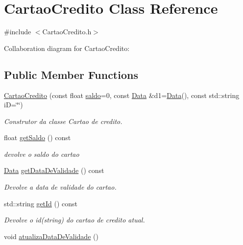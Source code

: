 \hypertarget{class_cartao_credito}{}\section{Cartao\+Credito Class Reference}
\label{class_cartao_credito}


{\ttfamily \#include $<$Cartao\+Credito.\+h$>$}



Collaboration diagram for Cartao\+Credito\+:
\subsection*{Public Member Functions}
\begin{DoxyCompactItemize}
\item 
\mbox{\hyperlink{class_cartao_credito_a49b6298290f8307df4a42b15175fb10f}{Cartao\+Credito}} (const float \mbox{\hyperlink{class_cartao_credito_a2c674ee17ab52017618bf5e3ef9dd3cd}{saldo}}=0, const \mbox{\hyperlink{class_data}{Data}} \&d1=\mbox{\hyperlink{class_data}{Data}}(), const std\+::string iD=\char`\"{}\char`\"{})
\begin{DoxyCompactList}\small\item\em Construtor da classe Cartao de credito. \end{DoxyCompactList}\item 
float \mbox{\hyperlink{class_cartao_credito_a5d10788d907961f86779efaecb6a231d}{get\+Saldo}} () const
\begin{DoxyCompactList}\small\item\em devolve o saldo do cartao \end{DoxyCompactList}\item 
\mbox{\hyperlink{class_data}{Data}} \mbox{\hyperlink{class_cartao_credito_ab28b73bbecc20b5c23348e1172230533}{get\+Data\+De\+Validade}} () const
\begin{DoxyCompactList}\small\item\em Devolve a data de validade do cartao. \end{DoxyCompactList}\item 
std\+::string \mbox{\hyperlink{class_cartao_credito_ab59d60e4d155e7f29aef888ea3139ee5}{get\+Id}} () const
\begin{DoxyCompactList}\small\item\em Devolve o id(string) do cartao de credito atual. \end{DoxyCompactList}\item 
void \mbox{\hyperlink{class_cartao_credito_a52daaab859e37d416c00044ef0fb2f27}{atualiza\+Data\+De\+Validade}} ()

\end{DoxyCompactItemize}
